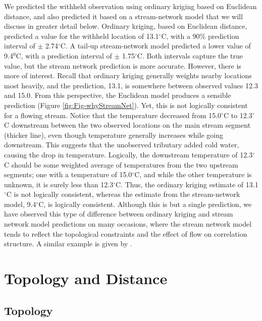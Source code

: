 \documentclass[]{book}
\theoremstyle{definition}
\theoremstyle{definition}
\theoremstyle{definition}
\theoremstyle{remark}
\begin{document}
We predicted the withheld observation using ordinary kriging
\citep{Cres:stat:1993} based on Euclidean distance, and also predicted
it based on a stream-network model \citep{Ver:Pete:Move:2010} that we
will discuss in greater detail below. Ordinary kriging, based on
Euclidean distance, predicted a value for the withheld location of
13.1\(^{\circ}\)C, with a 90\% prediction interval of \(\pm\)
2.74\(^{\circ}\)C. A tail-up stream-network model predicted a lower
value of 9.4\(^0\)C, with a prediction interval of \(\pm\)
1.75\(^{\circ}\)C. Both intervals capture the true value, but the stream
network prediction is more accurate. However, there is more of interest.
Recall that ordinary kriging generally weights nearby locations most
heavily, and the prediction, 13.1, is somewhere between observed values
12.3 and 15.0. From this perspective, the Euclidean model produces a
sensible prediction (Figure \ref{fig:Fig-whyStreamNet}). Yet, this is
not logically consistent for a flowing stream. Notice that the
temperature decreased from 15.0\(^{\circ}\)C to 12.3\(^{\circ}\)C
downstream between the two observed locations on the main stream segment
(thicker line), even though temperature generally increases while going
downstream. This suggests that the unobserved tributary added cold
water, causing the drop in temperature. Logically, the downstream
temperature of 12.3\(^{\circ}\)C should be some weighted average of
temperatures from the two upstream segments; one with a temperature of
15.0\(^{\circ}\)C, and while the other temperature is unknown, it is
surely less than 12.3\(^{\circ}\)C. Thus, the ordinary kriging estimate
of 13.1\(^{\circ}\)C is not logically consistent, whereas the estimate
from the stream-network model, 9.4\(^{\circ}\)C, is logically
consistent. Although this is but a single prediction, we have observed
this type of difference between ordinary kriging and stream network
model predictions on many occasions, where the stream network model
tends to reflect the topological constraints and the effect of flow on
correlation structure. A similar example is given by
\citet{Pete:Ver:Isaa:stre:2013}.

\hypertarget{topology-and-distance}{%
\chapter{Topology and Distance}\label{topology-and-distance}}

\hypertarget{topology}{%
\section{Topology}\label{topology}}
\end{document}
